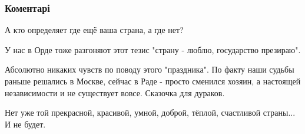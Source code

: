  
 
 
 
 
\subsubsection{Коментарі}

\begin{itemize}
 

А кто определяет где ещё ваша страна, а где нет?

У нас в Орде тоже разгоняют этот тезис "страну - люблю, государство презираю".


 

Абсолютно никаких чувств по поводу этого "праздника". По факту наши судьбы
раньше решались в Москве, сейчас в Раде - просто сменился хозяин, а настоящей
независимости и не существует вовсе. Сказочка для дураков.


 

Нет уже той прекрасной, красивой, умной, доброй, тёплой, счастливой страны... И
не будет.

\begin{itemize}
 

\end{itemize}
\end{itemize}
